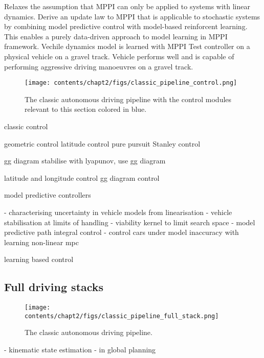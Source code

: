 \cite{Williams2017}
Relaxes the assumption that MPPI can only be applied to systems with linear dynamics.
Derive an update law to MPPI that is applicable to stochastic systems
by combining  model predictive control with model-based reinforcent learning.
This enables a purely data-driven approach to model learning in MPPI framework.
Vechile dynamics model is learned with MPPI 
Test controller  on a physical vehicle on a gravel track.
Vehicle performs well and is capable of performing aggressive driving manoeuvres on a gravel track. 

\begin{figure}[h]
    \centering
    \texttt{[image: contents/chapt2/figs/classic\_pipeline\_control.png]}
    \caption{The classic autonomous driving pipeline with the control modules relevant to this section colored in blue.}
    \label{fig:control}
\end{figure}

classic control

geometric control
latitude control
\cite{Coulter_1992} pure pursuit
\cite{Hoffmann2007} Stanley control

gg diagram
\cite{talvala2011} stabilise with lyapunov, use gg diagram

latitude and longitude control
\cite{Kritayakirana2010} gg diagram control


model predictive controllers

\cite{Pup2020} - characterising uncertainty in vehicle models from linearisation
\cite{Beal2013} - vehicle stabilisation at limits of handling
\cite{Liniger2019} - viability kernel to limit search space
\cite{Williams2016} - model predictive path integral control  
\cite{Hewing2018} - control cars under model inaccuracy with learning non-linear mpc

learning based control
\cite{Ji2018}
\cite{Brunner2018a}

\subsection{Full driving stacks}
\label{sec:full_driving_stacks}

\begin{figure}[h]
    \centering
    \texttt{[image: contents/chapt2/figs/classic\_pipeline\_full\_stack.png]}
    \caption{The classic autonomous driving pipeline.}
    \label{fig:full_stack}
\end{figure}

\cite{Valls2018}
\cite{sherif2020}
\cite{Wischnewski2019} - kinematic state estimation
\cite{Vazquez2020} - in global planning
\cite{alvarez2022}

